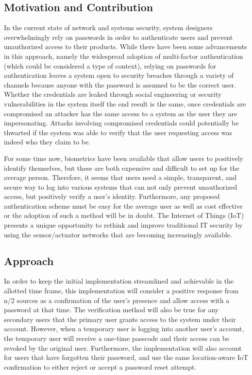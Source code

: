 \documentclass[11pt,journal]{IEEEtran}
\begin{document}
\subsection{Motivation and Contribution}
In the current state of network and systems security, system designers overwhelmingly rely on passwords in order to authenticate users and prevent unauthorized access to their products.  While there have been some advancements in this approach, namely the widespread adoption of multi-factor authentication (which could be considered a type of context), relying on passwords for authentication leaves a system open to security breaches through a variety of channels because anyone with the password is assumed to be the correct user.  Whether the credentials are leaked through social engineering or security vulnerabilities in the system itself the end result is the same, once credentials are compromised an attacker has the same access to a system as the user they are impersonating.  Attacks involving compromised credentials could potentially be thwarted if the system was able to verify that the user requesting access was indeed who they claim to be.

For some time now, biometrics have been available that allow users to positively identify themselves, but these are both expensive and difficult to set up for the average person.  Therefore, it seems that users need a simple, transparent, and secure way to log into various systems that can not only prevent unauthorized access, but positively verify a user’s identity.  Furthermore, any proposed authentication scheme must be easy for the average user as well as cost effective or the adoption of such a method will be in doubt.  The Internet of Things (IoT) presents a unique opportunity to rethink and improve traditional IT security by using the sensor/actuator networks that are becoming increasingly available. 

\subsection{Approach}
In order to keep the initial implementation streamlined and achievable in the allotted time frame, this implementation will consider a positive response from n/2 sources as a confirmation of the user’s presence and allow access with a password at that time.  The verification method will also be true for any secondary users that the primary user grants access to the system under their account.  However, when a temporary user is logging into another user's account, the temporary user will receive a one-time passcode and their access can be revoked by the original user.  Furthermore, the implementation will also account for users that have forgotten their password, and use the same location-aware IoT confirmation to either reject or accept a password reset attempt.
\end{document}
